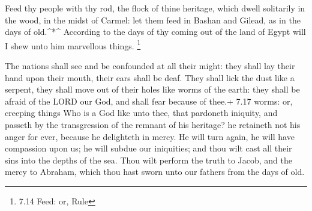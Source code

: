  Feed thy people with thy rod, the flock of thine heritage,
which dwell solitarily in the wood, in the midst of Carmel: let them
feed in Bashan and Gilead, as in the days of old.\^{}*\^{} 
According to the days of thy coming out of the land of Egypt will I shew
unto him marvellous things. \footnote{7.14 Feed: or, Rule}

 The nations shall see and be confounded at all their
might: they shall lay their hand upon their mouth, their ears shall be
deaf.  They shall lick the dust like a serpent, they shall
move out of their holes like worms of the earth: they shall be afraid of
the LORD our God, and shall fear because of thee.+ 7.17 worms: or,
creeping things  Who is a God like unto thee, that
pardoneth iniquity, and passeth by the transgression of the remnant of
his heritage? he retaineth not his anger for ever, because he delighteth
in mercy.  He will turn again, he will have compassion upon
us; he will subdue our iniquities; and thou wilt cast all their sins
into the depths of the sea.  Thou wilt perform the truth to
Jacob, and the mercy to Abraham, which thou hast sworn unto our fathers
from the days of old.
